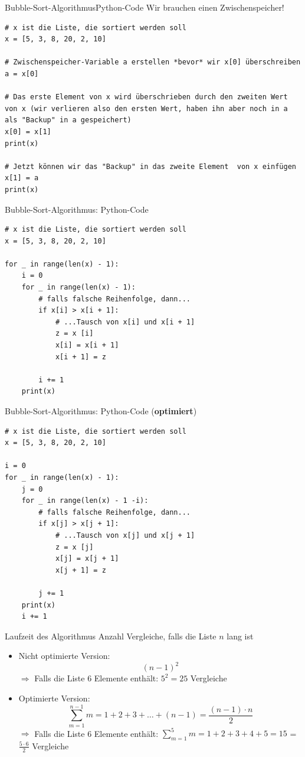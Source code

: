 \begin{frame}[fragile]{Bubble-Sort-Algorithmus}{Python-Code}
	Wir brauchen einen Zwischenspeicher!
	\begin{lstlisting}[basicstyle=\footnotesize\ttfamily]
# x ist die Liste, die sortiert werden soll
x = [5, 3, 8, 20, 2, 10]

# Zwischenspeicher-Variable a erstellen *bevor* wir x[0] überschreiben
a = x[0]

# Das erste Element von x wird überschrieben durch den zweiten Wert von x (wir verlieren also den ersten Wert, haben ihn aber noch in a als "Backup" in a gespeichert)
x[0] = x[1]
print(x)

# Jetzt können wir das "Backup" in das zweite Element  von x einfügen
x[1] = a
print(x)
	\end{lstlisting}
\end{frame}

\begin{frame}[fragile]{Bubble-Sort-Algorithmus: Python-Code}
	\begin{lstlisting}[basicstyle=\small\ttfamily]
# x ist die Liste, die sortiert werden soll
x = [5, 3, 8, 20, 2, 10]

for _ in range(len(x) - 1):
    i = 0
	for _ in range(len(x) - 1):
    	# falls falsche Reihenfolge, dann...
        if x[i] > x[i + 1]:
			# ...Tausch von x[i] und x[i + 1]
            z = x [i]
            x[i] = x[i + 1]
            x[i + 1] = z

        i += 1
    print(x)
	\end{lstlisting}
\end{frame}

\begin{frame}[fragile]{Bubble-Sort-Algorithmus: Python-Code (\textbf{optimiert})}
	\begin{lstlisting}[basicstyle=\small\ttfamily]
# x ist die Liste, die sortiert werden soll
x = [5, 3, 8, 20, 2, 10]

i = 0
for _ in range(len(x) - 1):
    j = 0
	for _ in range(len(x) - 1 -i):
    	# falls falsche Reihenfolge, dann...
        if x[j] > x[j + 1]:
			# ...Tausch von x[j] und x[j + 1]
            z = x [j]
            x[j] = x[j + 1]
            x[j + 1] = z

        j += 1
    print(x)
	i += 1
	\end{lstlisting}
\end{frame}

\begin{frame}[fragile]{Laufzeit des Algorithmus}
	Anzahl Vergleiche, falls die Liste $n$ lang ist
	\begin{itemize}
		\item \pause Nicht optimierte Version:
		      \[(n-1)^2\]
		      \pause $\Rightarrow$ Falls die Liste 6 Elemente enthält:  $5^2 = 25$ Vergleiche
		\item \pause Optimierte Version:
		      \[\sum_{m=1}^{n-1}m = 1 + 2 + 3 + \dots + (n-1) = \frac{(n-1) \cdot n}{2}\]
		      \pause $\Rightarrow$ Falls die Liste 6 Elemente enthält: $\displaystyle\sum_{m=1}^{5}m = 1 + 2 + 3 + 4 + 5 = 15$ = $\frac{5 \cdot 6}{2}$ Vergleiche
	\end{itemize}
\end{frame}

